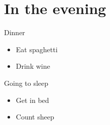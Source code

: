 \documentclass[
  28,
  ignorenonframetext,
  aspectratio=169,
]{beamer}
\providecommand{\tightlist}{%
  \setlength{\itemsep}{0pt}\setlength{\parskip}{0pt}}\usepackage{longtable,booktabs,array}
\begin{document}
\section{In the evening}\label{in-the-evening}

\begin{frame}{Dinner}
\label{dinner}
\begin{itemize}[<+->]
\tightlist
\item
  Eat spaghetti
\item
  Drink wine
\end{itemize}
\end{frame}

\begin{frame}{Going to sleep}
\label{going-to-sleep}
\begin{itemize}[<+->]
\tightlist
\item
  Get in bed
\item
  Count sheep
\end{itemize}
\end{frame}
\end{document}

